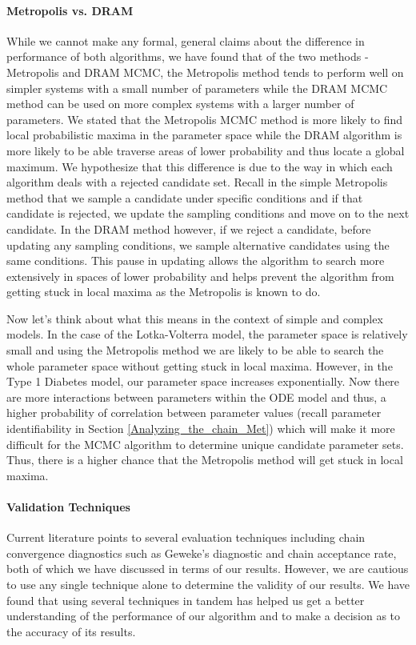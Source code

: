 \paragraph{Metropolis vs. DRAM}
While we cannot make any formal, general claims about the difference in performance of both algorithms, we have found that of the two methods - Metropolis and DRAM MCMC, the Metropolis method tends to perform well on simpler systems with a small number of parameters while the DRAM MCMC method can be used on more complex systems with a larger number of parameters. We stated that the Metropolis MCMC method is more likely to find local probabilistic maxima in the parameter space while the DRAM algorithm is more likely to be able traverse areas of lower probability and thus locate a global maximum. We hypothesize that this difference is due to the way in which each algorithm deals with a rejected candidate set. Recall in the simple Metropolis method that we sample a  candidate under specific conditions and if that candidate is rejected, we update the sampling conditions and move on to the next candidate. In the DRAM method however, if we reject a candidate, before updating any sampling conditions, we sample alternative candidates using the same conditions. This pause in updating allows the algorithm to search more extensively in spaces of lower probability and helps prevent the algorithm from getting stuck in local maxima as the Metropolis is known to do. \par Now let's think about what this means in the context of simple and complex models. In the case of the Lotka-Volterra model, the parameter space is relatively small and using the Metropolis method we are likely to be able to search the whole parameter space without getting stuck in local maxima. However, in the Type 1 Diabetes model, our parameter space increases exponentially. Now there are more interactions between parameters within the ODE model and thus, a higher probability of correlation between parameter values (recall parameter identifiability in Section \ref{Analyzing_the_chain_Met}) which will make it more difficult for the MCMC algorithm to determine unique candidate parameter sets. Thus, there is a higher chance that the Metropolis method will get stuck in local maxima.
\paragraph{Validation Techniques}
Current literature points to several evaluation techniques including chain convergence diagnostics such as Geweke's diagnostic and chain acceptance rate, both of which we have discussed in terms of our results. However, we are cautious to use any single technique alone to determine the validity of our results. We have found that using several techniques in tandem has helped us get a better understanding of the performance of our algorithm and to make a decision as to the accuracy of its results. 

